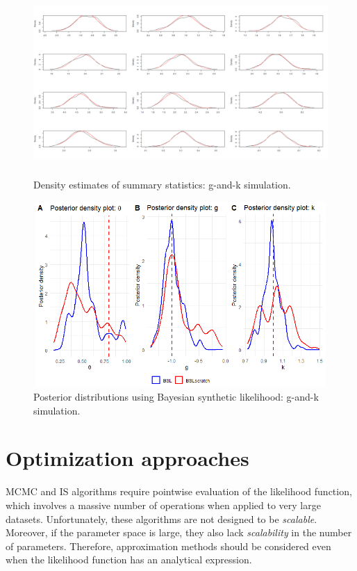 \begin{figure}[!h]
	\includegraphics[width=340pt, height=200pt]{Chapters/chapter15/figures/DensitiesSum.png}
	\caption[List of figure caption goes here]{Density estimates of summary statistics: g-and-k simulation.}\label{figDensSum}
\end{figure} 

\begin{figure}[!h]
	\includegraphics[width=340pt, height=200pt]{Chapters/chapter15/figures/BSLgksim.png}
	\caption[List of figure caption goes here]{Posterior distributions using Bayesian synthetic likelihood: g-and-k simulation.}\label{figBSL}
\end{figure}


\section{Optimization approaches}\label{sec15_2}

MCMC and IS algorithms require pointwise evaluation of the likelihood function, which involves a massive number of operations when applied to very large datasets. Unfortunately, these algorithms are not designed to be \textit{scalable}. Moreover, if the parameter space is large, they also lack \textit{scalability} in the number of parameters. Therefore, approximation methods should be considered even when the likelihood function has an analytical expression.

